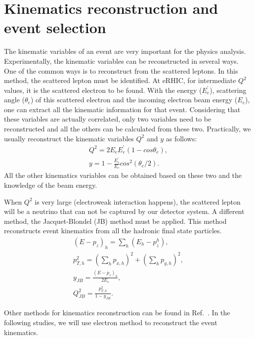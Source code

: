 \section{Kinematics reconstruction and event selection}
The kinematic variables of an event are very important for the physics analysis.
Experimentally, the kinematic variables can be reconstructed in several ways.
One of the common ways is to reconstruct from the scattered leptons. In this
method, the scattered lepton must be identified. At eRHIC, for intermediate
$Q^{2}$ values, it is the scattered electron to be found. With the energy
($E^{'}_{e}$), scattering angle ($\theta_{e}$) of this scattered electron and
the incoming electron beam energy ($E_{e}$), one can extract all the kinematic
information for that event. Considering that these variables are actually
correlated, only two variables need to be reconstructed and all the others can
be calculated from these two. Practically, we usually reconstruct the kinematic
variables $Q^{2}$ and $y$ as follows:
\begin{align}
Q^{2}=2E_{e}E^{'}_{e}(1-cos\theta_{e}), \\ \nonumber
y=1-\frac{E^{'}_{e}}{E_{e}}cos^{2}(\theta_{e}/2).
\label{eqn:electr_method}
\end{align}
All the other kinematics variables can be obtained based on these two and
the knowledge of the beam energy. 

When $Q^{2}$ is very large  (electroweak interaction happens), the scattered
lepton will be a neutrino that can not be captured by our detector system. A
different method, the Jacquet-Blondel (JB) method must be applied. This method
reconstructs event kinematics from all the hadronic final state particles.
\begin{align}
(E-p_{z})_{h} = \sum_{h}(E_{h}-p_{z}^{h}), \\ \nonumber
p_{T,h}^{2} = (\sum_{h}p_{x,h})^{2}+(\sum_{h}p_{y,h})^{2}, \\ \nonumber
y_{JB}=\frac{(E-p_{z})_{h}}{2E_{e}}, \\ \nonumber
Q_{JB}^{2}=\frac{p_{T,h}^{2}}{1-y_{JB}}.
\end{align}

Other methods for kinematics reconstruction can be found in
Ref.~\cite{Blumlein:2012bf}. In the following studies, we will use electron
method to reconstruct the event kinematics. 


